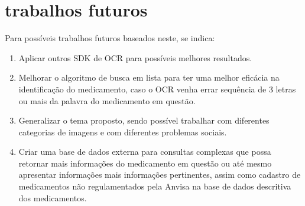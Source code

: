 \section{trabalhos futuros}


Para possíveis trabalhos futuros baseados neste, se indica:

\begin{enumerate}
  \item Aplicar outros SDK de OCR para possíveis melhores resultados.
  \item Melhorar o algoritmo de busca em lista para ter uma melhor eficácia na identificação do medicamento, caso o OCR venha errar sequência de 3 letras ou mais da palavra do medicamento em questão.
  \item Generalizar o tema proposto, sendo possível trabalhar com diferentes categorias de imagens e com diferentes problemas sociais.
  \item Criar uma base de dados externa para consultas complexas que possa retornar mais informações do medicamento em questão ou até mesmo apresentar informações mais informações pertinentes, assim como cadastro de medicamentos não regulamentados pela Anvisa na base de dados descritiva dos medicamentos.
\end{enumerate}


